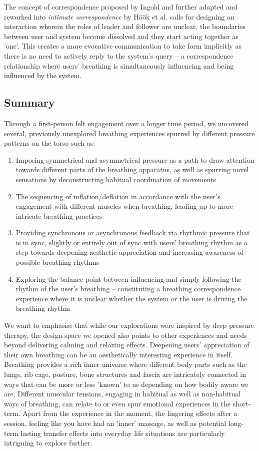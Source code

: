 The concept of correspondence proposed by Ingold \cite{ingold_being_2011} and further adapted and reworked into \textit{intimate correspondence} by Höök et al. \cite{hook_somaesthetic_2016} calls for designing an interaction wherein the roles of leader and follower are unclear, the boundaries between user and system become dissolved and they start acting together as 'one'. This creates a more evocative communication to take form implicitly as there is no need to actively reply to the system's query -- a correspondence relationship where users' breathing is simultaneously influencing and being influenced by the system.


\subsection{Summary}
Through a first-person felt engagement over a longer time period, we uncovered several, previously unexplored breathing experiences spurred by different pressure patterns on the torso such as:

\begin{enumerate}
    \item Imposing symmetrical and asymmetrical pressure as a path to draw attention towards different  parts of the breathing apparatus, as well as spurring novel sensations by deconstructing habitual coordination of movements
    \item The sequencing of inflation/deflation in accordance with the user's engagement with different muscles when breathing, leading up to more intricate breathing practices
    \item Providing synchronous or asynchronous feedback via rhythmic pressure that is in sync, slightly or entirely out of sync with users' breathing rhythm as a step towards deepening aesthetic appreciation and increasing awareness of possible breathing rhythms
    \item Exploring the balance point between influencing and simply following the rhythm of the user’s breathing -- constituting a breathing correspondence experience where it is unclear whether the system or the user is driving the breathing rhythm
\end{enumerate}

We want to emphasise that while our explorations were inspired by deep pressure therapy, the design space we opened also points to other experiences and needs beyond delivering calming and relaxing effects. Deepening users' appreciation of their own breathing can be an aesthetically interesting experience in itself. Breathing provides a rich inner universe where different body parts such as the lungs, rib cage, posture, bone structures and fascia are intricately connected in ways that can be more or less 'known' to us depending on how bodily aware we are. Different muscular tensions, engaging in habitual as well as non-habitual ways of breathing, can relate to or even spur emotional experiences in the short-term. Apart from the experience in the moment, the lingering effects after a session, feeling like you have had an 'inner' massage, as well as potential long-term lasting transfer effects into everyday life situations are particularly intriguing to explore further.

